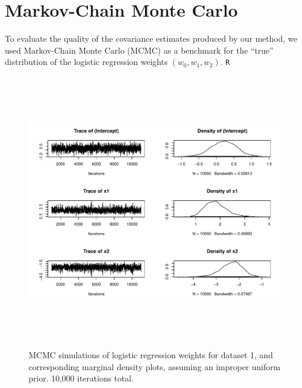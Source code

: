 
\section{Markov-Chain Monte Carlo}\label{sec:mcmc}

To evaluate the quality of the covariance estimates produced by our method, we used Markov-Chain Monte Carlo (MCMC) as a benchmark for the ``true'' distribution of the logistic regression weights $(w_0, w_1, w_2)$.  \texttt{R}

\begin{figure}
\centering
	\includegraphics[height=120mm]{figures/mcmc_uniform.pdf}
    \caption{MCMC simulations of logistic regression weights for dataset 1, and corresponding marginal density plots, assuming 
    an improper uniform prior. 10,000 iterations total.}  \label{fig:mcmc_iterations}  
\end{figure}

